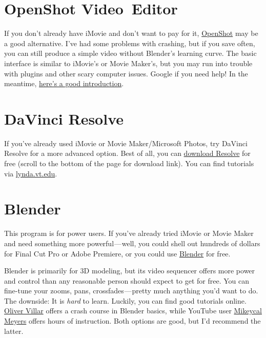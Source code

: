 \documentclass[]{book}
\theoremstyle{definition}
\theoremstyle{definition}
\theoremstyle{definition}
\theoremstyle{remark}
\begin{document}
\hypertarget{openshot-videoeditor}{%
\section{OpenShot Video~Editor}\label{openshot-videoeditor}}

If you don't already have iMovie and don't want to pay for it,
\href{http://www.openshot.org/}{OpenShot} may be a good alternative.
I've had some problems with crashing, but if you save often, you can
still produce a simple video without Blender's learning curve. The basic
interface is similar to iMovie's or Movie Maker's, but you may run into
trouble with plugins and other scary computer issues. Google if you need
help! In the meantime,
\href{https://www.youtube.com/watch?v=NcUS2Jt0icE}{here's a good
introduction}.

\hypertarget{davinci-resolve}{%
\section{DaVinci Resolve}\label{davinci-resolve}}

If you've already used iMovie or Movie Maker/Microsoft Photos, try
DaVinci Resolve for a more advanced option. Best of all, you can
\href{https://www.blackmagicdesign.com/products/davinciresolve/}{download
Resolve} for free (scroll to the bottom of the page for download link).
You can find tutorials via \href{http://lynda.vt.edu/}{lynda.vt.edu}.

\hypertarget{blender}{%
\section{Blender}\label{blender}}

This program is for power users. If you've already tried iMovie or Movie
Maker and need something more powerful --- well, you could shell out
hundreds of dollars for Final Cut Pro or Adobe Premiere, or you could
use \href{https://www.blender.org/}{Blender} for free.

Blender is primarily for 3D modeling, but its video sequencer offers
more power and control than any reasonable person should expect to get
for free. You can fine-tune your zooms, pans, crossfades --- pretty much
anything you'd want to do. The downside: It is \emph{hard} to learn.
Luckily, you can find good tutorials online.
\href{https://www.youtube.com/watch?v=zYVZ6rtayaA}{Oliver Villar} offers
a crash course in Blender basics, while YouTube user
\href{https://www.youtube.com/playlist?list=PLjyuVPBuorqIhlqZtoIvnAVQ3x18sNev4}{Mikeycal
Meyers} offers hours of instruction. Both options are good, but I'd
recommend the latter.
\end{document}
